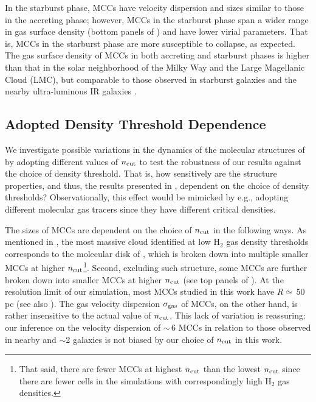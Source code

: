 \IfFileExists{emulateapjlegacy.cls}{\documentclass[iop]{emulateapjlegacy}}{\documentclass[iop]{emulateapj}}
\begin{document}
In the starburst phase, MCCs have velocity dispersion and sizes similar to those in the accreting phase; however, MCCs in the starburst phase span a wider range in gas surface density (bottom panels of ) and have lower virial parameters.
%
That is, MCCs in the starburst phase are more susceptible to collapse, as expected. The gas surface density of MCCs in both accreting and starburst phases is higher than that in the solar neighborhood of the Milky Way and the Large Magellanic Cloud (LMC), but comparable to those observed in starburst galaxies and the nearby ultra-luminous IR galaxies \citep[ULIRGS;][]{Boulares90a, Scoville91a, Weiss01a, Hughes10a, Leroy15a}.
%

\subsection{Adopted Density Threshold Dependence}\label{sec:ncut}

We investigate possible variations in the dynamics of the molecular structures of \flower by adopting different values of $n_{\rm cut}$ to test the robustness of our results against the choice of density threshold.
That is, how sensitively are the structure properties, and thus, the results presented in , dependent on the choice of density thresholds?
Observationally, this effect would be mimicked by e.g., adopting different molecular gas tracers since they have different critical densities.

The sizes of MCCs are dependent on the choice of $n_{\rm cut}$ in the following ways. As mentioned in , the most massive cloud identified at low H$_2$ gas density thresholds corresponds to the molecular disk of \flower, which is broken down into multiple smaller MCCs at higher $n_{\rm cut}$\footnote{That said, there are fewer MCCs at highest $n_{\rm cut}$ than the lowest $n_{\rm cut}$ since there are fewer cells in the simulations with correspondingly high H$_2$ gas densities.}.
%
Second, excluding such structure, some MCCs are further broken down into smaller MCCs at higher $n_{\rm cut}$ (see top panels of ). At the resolution limit of our simulation, most MCCs studied in this work have $R\simeq$\,50\,pc (see also ).
%
The gas velocity dispersion $\sigma_{\rm gas}$ of MCCs, on the other hand, is rather insensitive to the actual value of $n_{\rm cut}$. This lack of variation is reassuring: our inference on the velocity dispersion of \z$\sim$\,6 MCCs in relation to those observed in nearby and \z$\sim$2 galaxies is not biased by our choice of $n_{\rm cut}$ in this work.
\end{document}
